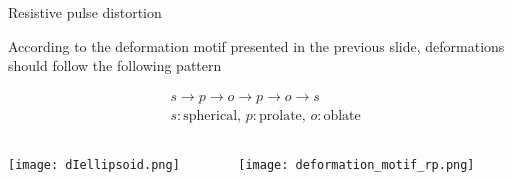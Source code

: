 
\begin{frame}[c]{Resistive pulse distortion}

		According to the deformation motif presented in the previous slide, deformations should follow the following pattern
		
		\begin{equation*}
			\begin{split}
				&s\rightarrow p\rightarrow o\rightarrow p\rightarrow o\rightarrow s \\
				&s: \mathrm{spherical},\,p: \mathrm{prolate},\,o:\mathrm{oblate}
			\end{split}
		\end{equation*}
		

	
	
	\begin{columns}[t]
		\begin{column}[T]{2in}
			{\centering
				\texttt{[image: dIellipsoid.png]} \\
				\par
			}
		\end{column}
		
		
		\begin{column}[T]{2.5in}
			{\centering
				\texttt{[image: deformation\_motif\_rp.png]} \\
				\par
			}
		\end{column}
	\end{columns}
			

\end{frame}




